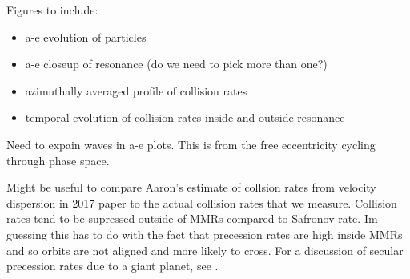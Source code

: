\documentclass[twocolumn]{aastex63}
\begin{document}






Figures to include:

\begin{itemize}
    \item a-e evolution of particles
    \item a-e closeup of resonance (do we need to pick more than one?)
    \item azimuthally averaged profile of collision rates
    \item temporal evolution of collision rates inside and outside resonance
\end{itemize}

Need to expain waves in a-e plots. This is from the free eccentricity cycling through phase space.

Might be useful to compare Aaron's estimate of collsion rates from velocity dispersion in 2017 paper to the actual collision rates that we measure. Collision rates tend to be supressed outside of MMRs compared to Safronov rate. Im guessing this has to do with the fact that precession rates are high inside MMRs and so orbits are not aligned and more likely to cross. For a discussion of secular precession rates due to a giant planet, see \citet{2009MNRAS.399.1403M}.



\clearpage
\end{document}
